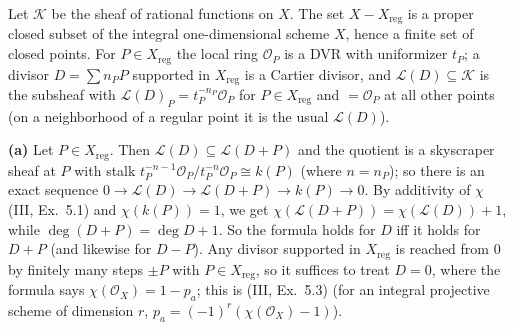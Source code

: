 \documentclass[11pt]{article}
\begin{document}
\pf
Let $\mathcal K$ be the sheaf of rational functions on $X$. The set $X-X_{\mathrm{reg}}$ is a proper closed subset of the integral one-dimensional scheme $X$, hence a finite set of closed points. For $P\in X_{\mathrm{reg}}$ the local ring $\mathcal O_P$ is a DVR with uniformizer $t_P$; a divisor $D=\sum n_PP$ supported in $X_{\mathrm{reg}}$ is a Cartier divisor, and $\mathcal L(D)\subseteq\mathcal K$ is the subsheaf with $\mathcal L(D)_P=t_P^{-n_P}\mathcal O_P$ for $P\in X_{\mathrm{reg}}$ and $=\mathcal O_P$ at all other points (on a neighborhood of a regular point it is the usual $\mathcal L(D)$).

\textbf{(a)} Let $P\in X_{\mathrm{reg}}$. Then $\mathcal L(D)\subseteq\mathcal L(D+P)$ and the quotient is a skyscraper sheaf at $P$ with stalk $t_P^{-n-1}\mathcal O_P/t_P^{-n}\mathcal O_P\cong k(P)$ (where $n=n_P$); so there is an exact sequence $0\to\mathcal L(D)\to\mathcal L(D+P)\to k(P)\to0$. By additivity of $\chi$ (III, Ex.~5.1) and $\chi(k(P))=1$, we get $\chi(\mathcal L(D+P))=\chi(\mathcal L(D))+1$, while $\deg(D+P)=\deg D+1$. So the formula holds for $D$ iff it holds for $D+P$ (and likewise for $D-P$). Any divisor supported in $X_{\mathrm{reg}}$ is reached from $0$ by finitely many steps $\pm P$ with $P\in X_{\mathrm{reg}}$, so it suffices to treat $D=0$, where the formula says $\chi(\mathcal O_X)=1-p_a$; this is (III, Ex.~5.3) (for an integral projective scheme of dimension $r$, $p_a=(-1)^r(\chi(\mathcal O_X)-1)$).
\end{document}
